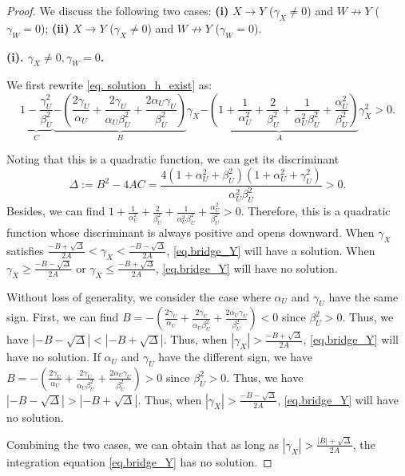 \documentclass[10pt,a4paper]{amsart}
\def\to{\rightarrow}
\begin{document}
\begin{proof}
We discuss the following two cases: \textbf{(i)} $X \to Y$ ($\gamma_X \neq 0$) and $W \not\to Y$ ($\gamma_W = 0$); \textbf{(ii)} $X \to Y$ ($\gamma_X \neq 0$) and $W \not\to Y$ ($\gamma_W = 0$).

\textbf{(i). $\gamma_X\ne0,\gamma_W=0$.}

We first rewrite \eqref{eq. solution_h_exist} as:
$$
\underset{C}{\underbrace{1-\frac{\gamma_{U}^{2}}{\beta_{U}^{2}}}}\underset{B}{\underbrace{-\left( \frac{2\gamma_U}{\alpha_U}+\frac{2\gamma_U}{\alpha_U\beta_{U}^{2}}+\frac{2\alpha_U\gamma_U}{\beta_{U}^{2}} \right) }}\gamma_X\underset{A}{\underbrace{-\left( 1+\frac{1}{\alpha_{U}^{2}}+\frac{2}{\beta_{U}^{2}}+\frac{1}{\alpha_{U}^{2}\beta_{U}^{2}}+\frac{\alpha_{U}^{2}}{\beta_{U}^{2}} \right) }}\gamma_{X}^{2}>0.
$$

Noting that this is a quadratic function, we can get its discriminant 
$$
\Delta:=B^2-4AC=\frac{4\left( 1+\alpha_{U}^{2}+\beta_{U}^{2} \right) \left( 1+\alpha_{U}^{2}+\gamma_{U}^{2} \right)}{\alpha_{U}^{2}\beta_{U}^{2}}>0.
$$
Besides, we can find $ 1+\frac{1}{\alpha_{U}^{2}}+\frac{2}{\beta_{U}^{2}}+\frac{1}{\alpha_{U}^{2}\beta_{U}^{2}}+\frac{\alpha_{U}^{2}}{\beta_{U}^{2}}>0$. Therefore, this is a quadratic function whose discriminant is always positive and opens downward. When $\gamma_X$ satisfies $\frac{-B+\sqrt{\Delta}}{2A}<\gamma_X<\frac{-B-\sqrt{\Delta}}{2A}$, \eqref{eq.bridge_Y} will have a solution. When $\gamma_X\geq\frac{-B-\sqrt{\Delta}}{2A}$ or $\gamma_X\leq\frac{-B+\sqrt{\Delta}}{2A}$, \eqref{eq.bridge_Y} will have no solution. 

Without loss of generality, we consider the case where $\alpha_U$ and $\gamma_U$ have the same sign. First, we can find $ B=-(\frac{2\gamma_U}{\alpha_U}+\frac{2\gamma_U}{\alpha_U\beta_{U}^{2}}+\frac{2\alpha_U\gamma_U}{\beta_{U}^{2}})<0$ since $\beta_U^2>0$. Thus, we have $|-B-\sqrt{\Delta}|<|-B+\sqrt{\Delta}|$. Thus, when $|\gamma_X|>\frac{-B+\sqrt{\Delta}}{2A}$,  \eqref{eq.bridge_Y} will have no solution. If $\alpha_U$ and $\gamma_U$ have the different sign, we have $ B=-(\frac{2\gamma_U}{\alpha_U}+\frac{2\gamma_U}{\alpha_U\beta_{U}^{2}}+\frac{2\alpha_U\gamma_U}{\beta_{U}^{2}})>0$ since $\beta_U^2>0$. Thus, we have $|-B-\sqrt{\Delta}|>|-B+\sqrt{\Delta}|$. Thus, when $|\gamma_X|>\frac{-B-\sqrt{\Delta}}{2A}$,  \eqref{eq.bridge_Y} will have no solution.  

Combining the two cases, we can obtain that as long as $|\gamma_X|>\frac{|B|+\sqrt{\Delta}}{2A}$, the integration equation \eqref{eq.bridge_Y} has no solution.


\end{proof}
\end{document}
